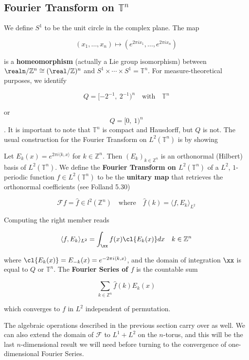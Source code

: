 \hypertarget{fourier-transform-on-mathbbtn}{%
\subsection{\texorpdfstring{Fourier Transform on
\(\mathbb{T}^n\)}{Fourier Transform on \textbackslash mathbb\{T\}\^{}n}}\label{fourier-transform-on-mathbbtn}}

We define \(S^1\) to be the unit circle in the complex plane. The map

\[
(x_1,\ldots, x_n)\mapsto (e^{2\pi i x_1},\ldots, e^{2\pi i x_n})
\]

is a \textbf{homeomorphism} (actually a Lie group isomorphism) between
\(\realn/\mathbb{Z}^n\cong (\real/\mathbb{Z})^n\) and
\(S^1\times \cdots\times S^1 = \mathbb{T}^n\). For measure-theoretical
purposes, we identify

\[
Q = [-2^{-1},\: 2^{-1})^n\quad\text{with}\quad \mathbb{T}^n
\]

or \[Q = [0,\: 1)^n\]. It is important to note that \(\mathbb{T}^n\) is
compact and Hausdorff, but \(Q\) is not. The usual construction for the
Fourier Transform on \(L^2(\mathbb{T}^n)\) is by showing

Let \(E_{k}(x) = e^{2\pi i\langle k,x\rangle}\) for
\(k\in\mathbb{Z}^n\). Then \((E_k)_{k\in \mathbb{Z}^n}\) is an
orthonormal (Hilbert) basis of \(L^2(\mathbb{T}^n)\). We define the
\textbf{Fourier Transform on \(L^2(\mathbb{T}^n)\)} of a \(L^2\),
\(1\)-periodic function \(f\in L^2(\mathbb{T}^n)\) to be the
\textbf{unitary map} that retrieves the orthonormal coefficients (see
Folland 5.30)

\[
\mathcal{F}f = \hat{f}\in l^2(\mathbb{Z}^n)\quad\text{where}\quad \hat{f}(k) = \langle f,E_k\rangle_{L^2}
\]

Computing the right member reads

\[
\langle f, E_k\rangle_{L^2} = \int_{\xx}f(x)\cl{E_k(x)}dx\quad k\in\mathbb{Z}^n
\]

where \(\cl{E_k(x)} = E_{-k}(x) = e^{-2\pi i\langle k,x\rangle}\), and
the domain of integration \(\xx\) is equal to \(Q\) or \(\mathbb{T}^n\).
The \textbf{Fourier Series of \(f\)} is the countable sum

\[
\sum_{k\in\mathbb{Z}^n}\hat{f}(k) E_k(x)
\]

which converges to \(f\) in \(L^2\) independent of permutation.

The algebraic operations described in the previous section carry over as
well. We can also extend the domain of \(\mathcal{F}\) to \(L^1 + L^2\)
on the \(n\)-torus, and this will be the last \(n\)-dimensional result
we will need before turning to the convergence of one-dimensional
Fourier Series.

